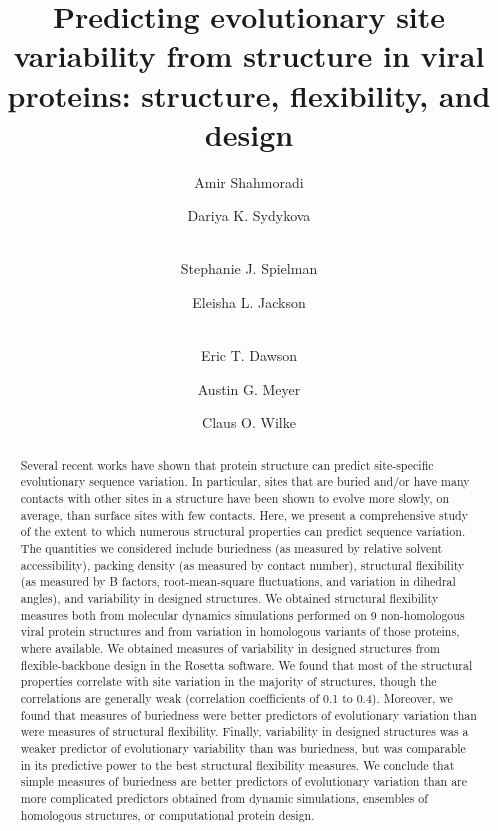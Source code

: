 \documentclass[smallextended]{svjour3}
\begin{document}
\title{Predicting evolutionary site variability from structure in viral proteins: structure, flexibility, and design}

\author{Amir Shahmoradi \and Dariya K. Sydykova \and \\ Stephanie J. Spielman \and Eleisha L. Jackson \and \\ Eric T. Dawson \and Austin G. Meyer \and Claus O. Wilke}


\date{}

\maketitle

\begin{abstract}
Several recent works have shown that protein structure can predict site-specific evolutionary sequence variation. In particular, sites that are buried and/or have many contacts with other sites in a structure have been shown to evolve more slowly, on average, than surface sites with few contacts. Here, we present a comprehensive study of the extent to which numerous structural properties can predict sequence variation. The quantities we considered include buriedness (as measured by relative solvent accessibility), packing density (as measured by contact number), structural flexibility (as measured by B factors, root-mean-square fluctuations, and variation in dihedral angles), and variability in designed structures. We obtained structural flexibility measures both from molecular dynamics simulations performed on 9 non-homologous viral protein structures and from variation in homologous variants of those proteins, where available. We obtained measures of variability in designed structures from flexible-backbone design in the Rosetta software. We found that most of the structural properties correlate with site variation in the majority of structures, though the correlations are generally weak (correlation coefficients of 0.1 to 0.4). {\color{red}Moreover, we found that measures of buriedness were better predictors of evolutionary variation than were measures of structural flexibility. Finally, variability in designed structures was a weaker predictor of evolutionary variability than was buriedness, but was comparable in its predictive power to the best structural flexibility measures. We conclude that simple measures of buriedness are better predictors of evolutionary variation than are more complicated predictors obtained from dynamic simulations, ensembles of homologous structures, or computational protein design.}
\end{abstract}
\end{document}
